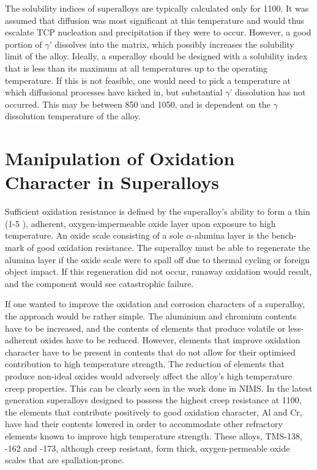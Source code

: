 The solubility indices of superalloys are typically calculated only for 1100\celsius.  It was assumed that diffusion was most significant at this temperature and would thus escalate TCP nucleation and precipitation if they were to occur.  However, a good portion of $\gamma$' dissolves into the matrix, which possibly increases the solubility limit of the alloy.  Ideally, a superalloy should be designed with a solubility index that is less than its maximum at all temperatures up to the operating temperature.  If this is not feasible, one would need to pick a temperature at which diffusional processes have kicked in, but substantial $\gamma$' dissolution has not occurred.  This may be between 850 and 1050\celsius, and is dependent on the $\gamma$ dissolution temperature of the alloy.

\section{Manipulation of Oxidation Character in Superalloys}

Sufficient oxidation resistance is defined by the superalloy’s ability to form a thin (1-5 \micro\metre), adherent, oxygen-impermeable oxide layer upon exposure to high temperature.  An oxide scale consisting of a sole $\alpha$-alumina layer is the bench-mark of good oxidation resistance.  The superalloy must be able to regenerate the alumina layer if the oxide scale were to spall off due to thermal cycling or foreign object impact.  If this regeneration did not occur, runaway oxidation would result, and the component would see catastrophic failure.

If one wanted to improve the oxidation and corrosion characters of a superalloy, the approach would be rather simple.  The aluminium and chromium contents have to be increased, and the contents of elements that produce volatile or less-adherent oxides have to be reduced.  However, elements that improve oxidation character have to be present in contents that do not allow for their optimised contribution to high temperature strength.  The reduction of elements that produce non-ideal oxides would adversely affect the alloy’s high temperature creep properties.  This can be clearly seen in the work done in NIMS.  In the latest generation superalloys designed to possess the highest creep resistance at 1100\celsius, the elements that contribute positively to good oxidation character, Al and Cr, have had their contents lowered in order to accommodate other refractory elements known to improve high temperature strength.  These alloys, TMS-138, -162 and -173, although creep resistant, form thick, oxygen-permeable oxide scales that are spallation-prone. 
\clearpage
